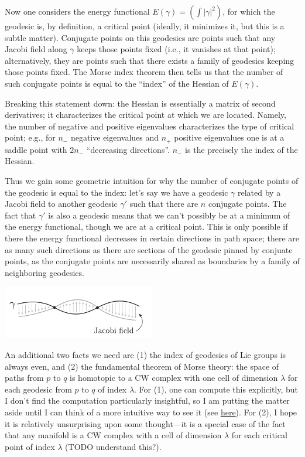 \documentclass{report}
\begin{document}
Now one considers the energy functional $ E (\gamma) = (\int |\gamma|^2) $, for
which the geodesic is, by definition, a critical point (ideally, it minimizes
it, but this is a subtle matter). Conjugate points on this geodesics are points
such that any Jacobi field along $ \gamma $ keeps those points fixed (i.e., 
it vanishes at that point); alternatively, they are points such that there
exists a family of geodesics keeping those points fixed. The Morse index theorem
then tells us that the
number of such conjugate points is equal to the ``index'' of the Hessian of $
E(\gamma) $. 

Breaking this statement down: the Hessian is essentially a matrix of second
derivatives; it characterizes the critical point at which we are located.
Namely, the number of negative and positive eigenvalues characterizes the type
of critical point; e.g., for $ n_- $ negative eigenvalues and $ n_+ $ positive
eigenvalues one is at a saddle point with $ 2n_- $ ``decreasing directions''. $
n_- $ is the precisely the index of the Hessian. 

Thus we gain some geometric intuition for why the number 
of conjugate points of the geodesic is equal to the index: let's say we have a 
geodesic $ \gamma $ related by a Jacobi field to another geodesic $ \gamma' $
such that there are $ n $ conjugate points. The fact that $ \gamma' $ is also 
a geodesic means that we can't possibly be at a minimum of the energy functional, 
though we are at a critical point. This is only possible if there the energy 
functional decreases in certain directions in path space; there are as many 
such directions as there are sections of the geodesic pinned by conjuate points,  
as the conjugate points are necessarily shared as boundaries by a family of 
neighboring geodesics. 

\begin{center}
	\includegraphics[width=0.5\textwidth]{fig/march/conjugate-points.pdf}
\end{center}

An additional two facts we need are (1) the index of geodesics of Lie groups is 
always even, and (2) the fundamental theorem of Morse theory: the space of paths 
from $ p $ to $ q $ is homotopic to a CW complex with one cell of dimension $
\lambda $ for each geodesic from $ p $ to $ q $ of index $ \lambda $. For (1),
one can compute this explicitly, but I don't find the computation particularly
insightful, so I am putting the matter aside until I can think of a more
intuitive way to see it (see
\href{https://mathoverflow.net/questions/66924/conjugate-points-in-lie-groups-with-left-invariant-metrics}{here}).
For (2), I hope it is relatively unsurprising upon some thought---it is a
special case of the fact that any manifold is a CW complex 
with a cell of dimension $ \lambda $ for each critical point of index $ \lambda $
(TODO understand this?).
\end{document}
